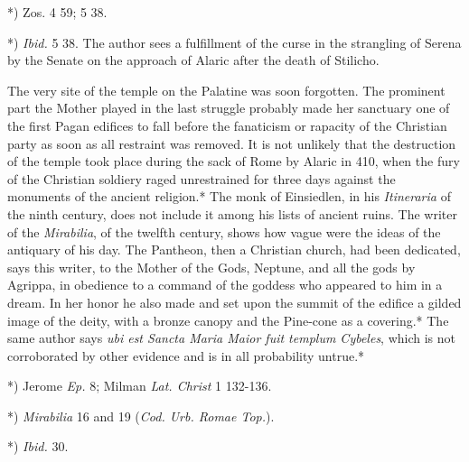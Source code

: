 \documentclass[a4paper, 11pt, oneside, polutonikogreek, english]{article}
\begin{document}
*) Zos. 4 59; 5 38.

*) \emph{Ibid.} 5 38. The author sees a fulfillment of the curse in the strangling of Serena by the Senate on the approach of Alaric after the death of Stilicho.

The very site of the temple on the Palatine was soon forgotten. The prominent part the Mother played in the last struggle probably made her sanctuary one of the first Pagan edifices to fall before the fanaticism or rapacity of the Christian party as soon as all restraint was removed. It is not unlikely that the destruction of the temple took place during the sack of Rome by Alaric in 410, when the fury of the Christian soldiery raged unrestrained for three days against the monuments of the ancient religion.* The monk of Einsiedlen, in his \emph{Itineraria} of the ninth century, does not include it among his lists of ancient ruins. The writer of the \emph{Mirabilia}, of the twelfth century, shows how vague were the ideas of the antiquary of his day. The Pantheon, then a Christian church, had been dedicated, says this writer, to the Mother of the Gods, Neptune, and all the gods by Agrippa, in obedience to a command of the goddess who appeared to him in a dream. In her honor he also made and set upon the summit of the edifice a gilded image of the deity, with a bronze canopy and the Pine-cone as a covering.* The same author says \emph{ubi est Sancta Maria Maior fuit templum Cybeles}, which is not corroborated by other evidence and is in all probability untrue.*

*) Jerome \emph{Ep.} 8; Milman \emph{Lat. Christ} 1 132-136.

*) \emph{Mirabilia} 16 and 19 (\emph{Cod. Urb. Romae Top.}).

*) \emph{Ibid.} 30.
\end{document}
